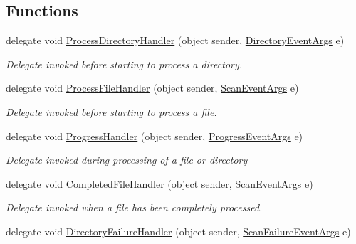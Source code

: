 \subsection*{Functions}
\begin{DoxyCompactItemize}
\item 
delegate void \hyperlink{namespace_i_c_sharp_code_1_1_sharp_zip_lib_1_1_core_a37bb92cd3528127a005ef2ca4dd478f5}{Process\+Directory\+Handler} (object sender, \hyperlink{class_i_c_sharp_code_1_1_sharp_zip_lib_1_1_core_1_1_directory_event_args}{Directory\+Event\+Args} e)
\begin{DoxyCompactList}\small\item\em Delegate invoked before starting to process a directory. \end{DoxyCompactList}\item 
delegate void \hyperlink{namespace_i_c_sharp_code_1_1_sharp_zip_lib_1_1_core_abba22d663b2d9f4fa4bda2dc2e867bb4}{Process\+File\+Handler} (object sender, \hyperlink{class_i_c_sharp_code_1_1_sharp_zip_lib_1_1_core_1_1_scan_event_args}{Scan\+Event\+Args} e)
\begin{DoxyCompactList}\small\item\em Delegate invoked before starting to process a file. \end{DoxyCompactList}\item 
delegate void \hyperlink{namespace_i_c_sharp_code_1_1_sharp_zip_lib_1_1_core_a55f409bd1114da81c14d18c4d8682968}{Progress\+Handler} (object sender, \hyperlink{class_i_c_sharp_code_1_1_sharp_zip_lib_1_1_core_1_1_progress_event_args}{Progress\+Event\+Args} e)
\begin{DoxyCompactList}\small\item\em Delegate invoked during processing of a file or directory \end{DoxyCompactList}\item 
delegate void \hyperlink{namespace_i_c_sharp_code_1_1_sharp_zip_lib_1_1_core_aecab27a02c97037c68a78142fbbdc069}{Completed\+File\+Handler} (object sender, \hyperlink{class_i_c_sharp_code_1_1_sharp_zip_lib_1_1_core_1_1_scan_event_args}{Scan\+Event\+Args} e)
\begin{DoxyCompactList}\small\item\em Delegate invoked when a file has been completely processed. \end{DoxyCompactList}\item 
delegate void \hyperlink{namespace_i_c_sharp_code_1_1_sharp_zip_lib_1_1_core_a59ce8afe31b0ed5684e54008b1c8dd33}{Directory\+Failure\+Handler} (object sender, \hyperlink{class_i_c_sharp_code_1_1_sharp_zip_lib_1_1_core_1_1_scan_failure_event_args}{Scan\+Failure\+Event\+Args} e)

\end{DoxyCompactItemize}
